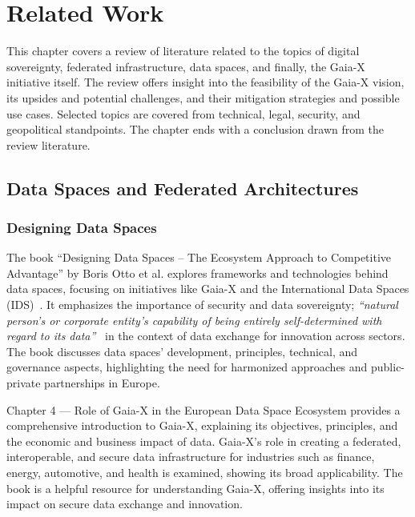 \chapter{Related Work}\label{ch:related-work}

\begin{chapterabstract}
    This chapter covers a review of literature related to the topics of digital sovereignty, federated infrastructure, data spaces, and finally, the Gaia-X initiative itself.
    The review offers insight into the feasibility of the Gaia-X vision, its upsides and potential challenges, and their mitigation strategies and possible use cases.
    Selected topics are covered from technical, legal, security, and geopolitical standpoints.
    The chapter ends with a conclusion drawn from the review literature.
\end{chapterabstract}

\section{Data Spaces and Federated Architectures}\label{sec:data-spaces-and-federated-architectures}
\subsection{Designing Data Spaces}\label{subsec:designing-data-spaces}

The book ``Designing Data Spaces -- The Ecosystem Approach to Competitive Advantage'' by Boris Otto et al. explores frameworks and technologies behind data spaces, focusing on initiatives like Gaia-X and the International Data Spaces (IDS)~\cite{designing_dataspaces}.
It emphasizes the importance of security and data sovereignty; \textit{``natural person's or corporate entity's capability of being entirely self-determined with regard to its data''}~\cite{designing_dataspaces} in the context of data exchange for innovation across sectors.
The book discusses data spaces' development, principles, technical, and governance aspects, highlighting the need for harmonized approaches and public-private partnerships in Europe.

Chapter 4 --- Role of Gaia-X in the European Data Space Ecosystem provides a comprehensive introduction to Gaia-X, explaining its objectives, principles, and the economic and business impact of data.
Gaia-X's role in creating a federated, interoperable, and secure data infrastructure for industries such as finance, energy, automotive, and health is examined, showing its broad applicability.
The book is a helpful resource for understanding Gaia-X, offering insights into its impact on secure data exchange and innovation.

